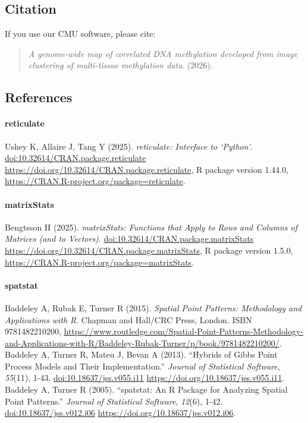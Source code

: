 \documentclass[
]{article}
\begin{document}
\subsection{Citation}\label{citation}

If you use our CMU software, please cite:

\begin{quote}
\emph{A genome-wide map of correlated DNA methylation developed from
image clustering of multi-tissue methylation data}. (2026).
\end{quote}

\subsection{References}\label{references}

\paragraph{reticulate}\label{reticulate}

Ushey K, Allaire J, Tang Y (2025). \emph{reticulate: Interface to
`Python'}. \url{doi:10.32614/CRAN.package.reticulate}
\url{https://doi.org/10.32614/CRAN.package.reticulate}, R package
version 1.44.0, \url{https://CRAN.R-project.org/package=reticulate}.

\paragraph{matrixStats}\label{matrixstats}

Bengtsson H (2025). \emph{matrixStats: Functions that Apply to Rows and
Columns of Matrices (and to Vectors)}.
\url{doi:10.32614/CRAN.package.matrixStats}
\url{https://doi.org/10.32614/CRAN.package.matrixStats}, R package
version 1.5.0, \url{https://CRAN.R-project.org/package=matrixStats}.

\paragraph{spatstat}\label{spatstat}

Baddeley A, Rubak E, Turner R (2015). \emph{Spatial Point Patterns:
Methodology and Applications with R}. Chapman and Hall/CRC Press,
London. ISBN 9781482210200,
\url{https://www.routledge.com/Spatial-Point-Patterns-Methodology-and-Applications-with-R/Baddeley-Rubak-Turner/p/book/9781482210200/}.
Baddeley A, Turner R, Mateu J, Bevan A (2013). ``Hybrids of Gibbs Point
Process Models and Their Implementation.'' \emph{Journal of Statistical
Software}, \emph{55}(11), 1-43. \url{doi:10.18637/jss.v055.i11}
\url{https://doi.org/10.18637/jss.v055.i11}. Baddeley A, Turner R
(2005). ``spatstat: An R Package for Analyzing Spatial Point Patterns.''
\emph{Journal of Statistical Software}, \emph{12}(6), 1-42.
\url{doi:10.18637/jss.v012.i06}
\url{https://doi.org/10.18637/jss.v012.i06}.
\end{document}
